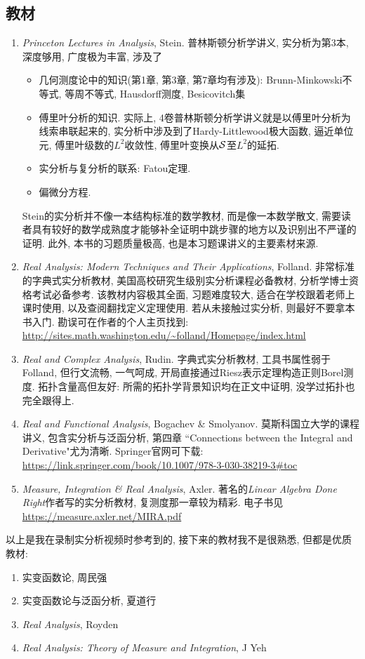 \subsection*{教材}
\begin{enumerate}
    \item \textit{Princeton Lectures in Analysis}, Stein. 普林斯顿分析学讲义, 实分析为第3本, 深度够用, 广度极为丰富, 涉及了
        \begin{itemize}
        \item 几何测度论中的知识(第1章, 第3章, 第7章均有涉及): Brunn-Minkowski不等式, 等周不等式, Hausdorff测度, Besicovitch集
        \item 傅里叶分析的知识. 实际上, 4卷普林斯顿分析学讲义就是以傅里叶分析为线索串联起来的, 实分析中涉及到了Hardy-Littlewood极大函数, 逼近单位元, 傅里叶级数的$L^2$收敛性, 傅里叶变换从$\mathcal{S}$至$L^2$的延拓.
        \item 实分析与复分析的联系: Fatou定理. 
        \item 偏微分方程. 
        \end{itemize}
    Stein的实分析并不像一本结构标准的数学教材, 而是像一本数学散文, 需要读者具有较好的数学成熟度才能够补全证明中跳步骤的地方以及识别出不严谨的证明. 此外, 本书的习题质量极高, 也是本习题课讲义的主要素材来源. 
    \item \textit{Real Analysis: Modern Techniques and Their Applications}, Folland. 非常标准的字典式实分析教材, 美国高校研究生级别实分析课程必备教材, 分析学博士资格考试必备参考. 该教材内容极其全面, 习题难度较大, 适合在学校跟着老师上课时使用, 以及查阅翻找定义定理使用. 若从未接触过实分析, 则最好不要拿本书入门. 勘误可在作者的个人主页找到: 
    \url{http://sites.math.washington.edu/~folland/Homepage/index.html}
    \item \textit{Real and Complex Analysis}, Rudin. 字典式实分析教材, 工具书属性弱于Folland, 但行文流畅, 一气呵成, 开局直接通过Riesz表示定理构造正则Borel测度. 拓扑含量高但友好: 所需的拓扑学背景知识均在正文中证明, 没学过拓扑也完全跟得上. 
    \item \textit{Real and Functional Analysis}, Bogachev & Smolyanov.
    莫斯科国立大学的课程讲义, 包含实分析与泛函分析, 第四章 ``Connections between the Integral and Derivative"尤为清晰. Springer官网可下载: \url{https://link.springer.com/book/10.1007/978-3-030-38219-3#toc}
    \item \textit{Measure, Integration & Real Analysis}, Axler. 著名的\textit{Linear Algebra Done Right}作者写的实分析教材, 复测度那一章较为精彩. 电子书见
    \url{https://measure.axler.net/MIRA.pdf}
\end{enumerate}
以上是我在录制实分析视频时参考到的, 接下来的教材我不是很熟悉, 但都是优质教材:
\begin{enumerate}
    \item 实变函数论, 周民强
    \item 实变函数论与泛函分析, 夏道行
    \item \textit{Real Analysis}, Royden
    \item \textit{Real Analysis: Theory of Measure and Integration}, J Yeh
\end{enumerate}

